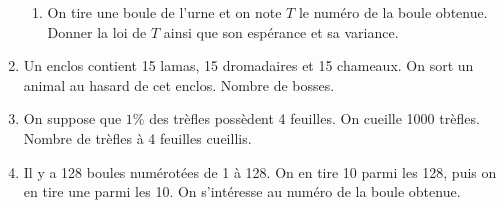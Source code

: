 \documentclass[a4paper, 11pt]{article}
\begin{document}
\begin{exemple}
\begin{enumerate}
\begin{enumerate}
		\item On tire une boule de l'urne et on note $T$ le num\'ero de la boule obtenue. Donner la loi de $T$ ainsi que son esp\'erance et sa variance.
	\end{enumerate}
		\item Un enclos contient 15 lamas, 15 dromadaires et 15 chameaux. On sort un animal au hasard de cet enclos. Nombre de bosses.
		\item On suppose que $1\%$ des tr\`efles poss\`edent 4 feuilles. On cueille 1000 tr\`efles. Nombre de tr\`efles \`a 4 feuilles cueillis.
		\item Il y a 128 boules num\'erot\'ees de 1 \`a 128. On en tire 10 parmi les 128, puis on en tire une parmi les 10. On s'int\'eresse au num\'ero de la boule obtenue.
  
	\end{enumerate}
\end{exemple}
\vspace{8cm}




\end{document}

